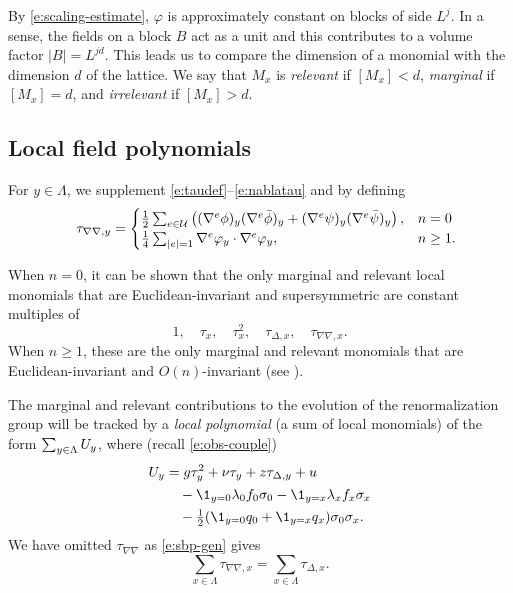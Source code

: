 By \eqref{e:scaling-estimate}, $\varphi$ is approximately constant on blocks of side $L^j$. In a sense,
the fields on a block $B$ act as a unit and this contributes to a volume factor $|B| = L^{jd}$.
This leads us to compare the dimension of a monomial with the dimension $d$ of the
lattice. We say that $M_x$ is \emph{relevant} if $[M_x] < d$, \emph{marginal} if
$[M_x] = d$, and \emph{irrelevant} if $[M_x] > d$.


\subsection{Local field polynomials}

For $y \in \Lambda$, we supplement \eqref{e:taudef}--\eqref{e:nablatau} and 
by defining
\begin{equation}
\label{e:tauphi2}
\quad \tau_{\nabla\nabla,y}
	=
\begin{cases}
\frac 12 \sum_{e \in \mathcal{U}}
\left(
	(\nabla^e \phi)_y (\nabla^e \bar\phi)_y +
	(\nabla^e \psi)_y (\nabla^e \bar\psi)_y
\right),
	& n = 0 \\
\frac{1}{4} \sum_{|e| = 1} \nabla^e \varphi_y \cdot \nabla^e \varphi_y,
	& n \ge 1.
\end{cases}
\end{equation}

When $n = 0$, it can be shown that the only marginal and relevant local monomials
that are Euclidean-invariant and supersymmetric are constant multiples of
\begin{equation}
1, \quad \tau_x, \quad \tau_x^2, \quad \tau_{\Delta,x}, \quad \tau_{\nabla\nabla,x}.
\end{equation}
When $n \ge 1$, these are the only marginal and relevant monomials that are
Euclidean-invariant and $O(n)$-invariant (see \cite{BBS-rg-pt}).

The marginal and relevant contributions to the evolution of the renormalization group
will be tracked by a \emph{local polynomial} (a sum of local monomials) of the form
$\sum_{y\in\Lambda} U_y$, where (recall \eqref{e:obs-couple})
\begin{align}
\lbeq{Vy}
\Vc_y
	&=
g \tau_y^2 + \nu \tau_y + z \tau_{\Delta,y}
	+ u
		\nnb&\quad
	- \1_{y=\pp}\lambda_{\pp} f_0 \sigma_0
	- \1_{y=\qq}\lambda_{\qq} f_x \sigma_x
		\nnb&\quad
	- \textstyle{\frac 12} (\1_{y=\pp} q_\pp + \1_{y=\qq}q_\qq )\sigma_\pp\sigma_\qq.
\end{align}
We have omitted $\tau_{\nabla\nabla}$ as \eqref{e:sbp-gen} gives
\begin{equation}
\label{e:nabla-delta}
\sum_{x\in\Lambda} \tau_{\nabla\nabla,x} = \sum_{x\in\Lambda} \tau_{\Delta,x}.
\end{equation}

